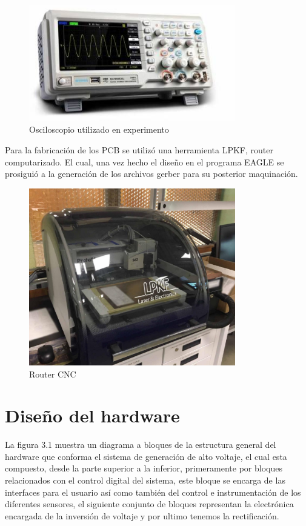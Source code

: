 \begin{figure}[H]
\centering
\includegraphics[width=9cm]{Capitulo3/figs/oscilo.png}
\caption{Osciloscopio utilizado en experimento}
\end{figure}

Para la fabricación de los PCB se utilizó una herramienta LPKF, router computarizado. El cual, una vez hecho el diseño en el programa EAGLE se prosiguió a la generación de los archivos gerber para su posterior maquinación. 

\begin{figure}[H]
\centering
\includegraphics[width=9cm]{Capitulo3/figs/proto.png}
\caption{Router CNC}
\end{figure}
\newpage


\section{Diseño del hardware}


La figura 3.1 muestra un diagrama a bloques de la estructura general del hardware que conforma el sistema de generación de alto voltaje, el cual esta compuesto, desde la parte superior a la inferior, primeramente por bloques relacionados con el control digital del sistema, este bloque se encarga de las interfaces para el usuario así como también del control e instrumentación de los diferentes sensores, el siguiente conjunto de bloques representan la electrónica encargada de la inversión de voltaje y por ultimo tenemos la rectificación.  \\

